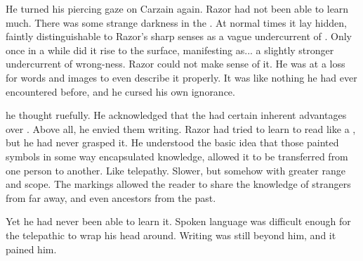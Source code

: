 He turned his piercing gaze on Carzain again. 
Razor had not been able to learn much. 
There was some strange darkness in the \human. 
At normal times it lay hidden, faintly distinguishable to Razor's sharp senses as a vague undercurrent of . 
Only once in a while did it rise to the surface, manifesting as... a slightly stronger undercurrent of wrong-ness. 
Razor could not make sense of it. 
He was at a loss for words and images to even describe it properly. 
It was like nothing he had ever encountered before, and he cursed his own ignorance. 

he thought ruefully. 
He acknowledged that the \scathae{} had certain inherent advantages over \nycans. 
Above all, he envied them writing. 
Razor had tried to learn to read like a \scatha, but he had never grasped it. 
He understood the basic idea that those painted symbols in some way encapsulated knowledge, allowed it to be transferred from one person to another. 
Like telepathy. 
Slower, but somehow with greater range and scope. 
The markings allowed the reader to share the knowledge of strangers from far away, and even ancestors from the past. 

Yet he had never been able to learn it. 
Spoken language was difficult enough for the telepathic \nycan{} to wrap his head around. 
Writing was still beyond him, and it pained him. 









